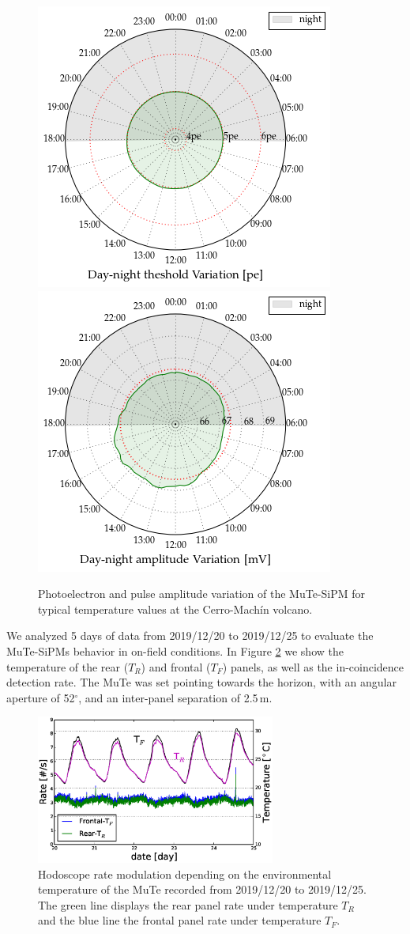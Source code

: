 \documentclass[a4paper,11pt]{article}
\begin{document}
\begin{figure}[htbp]
\centering 
\includegraphics[width=.4\textwidth]{Figures/peT.png}
\includegraphics[width=.4\textwidth]{Figures/peakT.png}
\caption{\label{fig:thre} Photoelectron and pulse amplitude variation of the MuTe-SiPM for typical temperature values at the Cerro-Mach\'in volcano.}
\end{figure}

We analyzed 5 days of data from 2019/12/20 to 2019/12/25 to evaluate the MuTe-SiPMs behavior in on-field conditions. In Figure \ref{fig:temp} we show the temperature of the rear ($T_R$) and frontal ($T_F$) panels, as well as the in-coincidence detection rate. The MuTe was set pointing towards the horizon, with an angular aperture of 52$^{\circ}$, and an inter-panel separation of 2.5\,m.

\begin{figure}[htbp]
\centering 
\includegraphics[width=0.7\textwidth]{Figures/Modulation.eps}
\caption{\label{fig:temp} Hodoscope rate modulation depending on the environmental temperature of the MuTe recorded from 2019/12/20 to 2019/12/25. The green line displays the rear panel rate under temperature $T_R$ and the blue line the frontal panel rate under temperature $T_F$. }
\end{figure}
\end{document}
